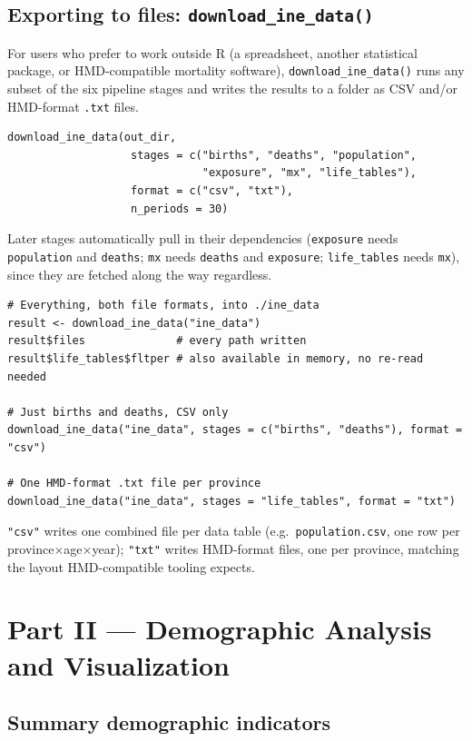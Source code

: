 \documentclass[11pt]{article}
\newcommand{\fn}[1]{\texttt{#1}}
\begin{document}
\subsection{Exporting to files: \fn{download\_ine\_data()}}

For users who prefer to work outside R (a spreadsheet, another statistical
package, or HMD-compatible mortality software), \fn{download\_ine\_data()}
runs any subset of the six pipeline stages and writes the results to a
folder as CSV and/or HMD-format \fn{.txt} files.

\begin{lstlisting}
download_ine_data(out_dir,
                   stages = c("births", "deaths", "population",
                              "exposure", "mx", "life_tables"),
                   format = c("csv", "txt"),
                   n_periods = 30)
\end{lstlisting}

Later stages automatically pull in their dependencies (\fn{exposure} needs
\fn{population} and \fn{deaths}; \fn{mx} needs \fn{deaths} and
\fn{exposure}; \fn{life\_tables} needs \fn{mx}), since they are fetched
along the way regardless.

\begin{lstlisting}
# Everything, both file formats, into ./ine_data
result <- download_ine_data("ine_data")
result$files              # every path written
result$life_tables$fltper # also available in memory, no re-read needed

# Just births and deaths, CSV only
download_ine_data("ine_data", stages = c("births", "deaths"), format = "csv")

# One HMD-format .txt file per province
download_ine_data("ine_data", stages = "life_tables", format = "txt")
\end{lstlisting}

\fn{"csv"} writes one combined file per data table (e.g.\
\fn{population.csv}, one row per province$\times$age$\times$year);
\fn{"txt"} writes HMD-format files, one per province, matching the layout
HMD-compatible tooling expects.

\newpage
\section{Part II --- Demographic Analysis and Visualization}
\label{sec:part2}

\subsection{Summary demographic indicators}
\end{document}
